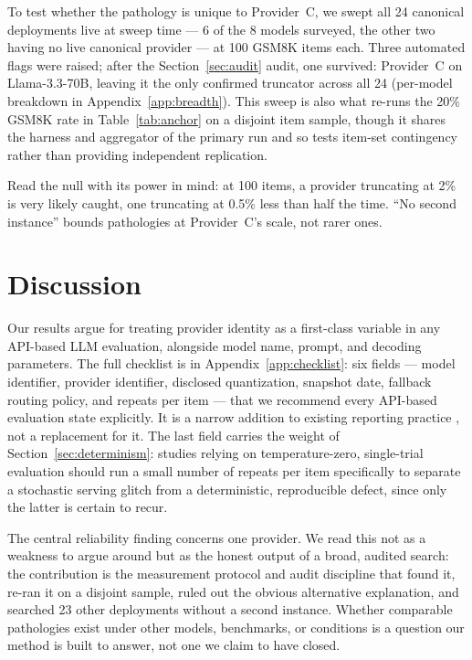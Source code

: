\documentclass[11pt]{article}
\begin{document}
To test whether the pathology is unique to Provider~C, we swept all 24
canonical deployments live at sweep time --- 6 of the 8 models
surveyed, the other two having no live canonical provider --- at 100
GSM8K items each. Three automated flags were raised; after the
Section~\ref{sec:audit} audit, one survived: Provider~C on
Llama-3.3-70B, leaving it the only confirmed truncator across all 24
(per-model breakdown in Appendix~\ref{app:breadth}). This sweep is
also what re-runs the 20\% GSM8K rate in Table~\ref{tab:anchor} on a
disjoint item sample, though it shares the harness and aggregator of
the primary run and so tests item-set contingency rather than
providing independent replication.

Read the null with its power in mind: at 100 items, a provider
truncating at 2\% is very likely caught, one truncating at 0.5\% less
than half the time. ``No second instance'' bounds pathologies at
Provider~C's scale, not rarer ones.
\section{Discussion}
\label{sec:checklist}

Our results argue for treating provider identity as a first-class
variable in any API-based LLM evaluation, alongside model name,
prompt, and decoding parameters. The full checklist is in Appendix~\ref{app:checklist}: six fields ---
model identifier, provider identifier, disclosed quantization,
snapshot date, fallback routing policy, and repeats per item --- that
we recommend every API-based evaluation state explicitly. It is a
narrow addition to existing reporting practice \citep{liang2023helm},
not a replacement for it. The last field carries the weight of
Section~\ref{sec:determinism}: studies relying on temperature-zero,
single-trial evaluation should run a small number of repeats per item
specifically to separate a stochastic serving glitch from a
deterministic, reproducible defect, since only the latter is certain
to recur.

The central reliability finding concerns one provider. We read this
not as a weakness to argue around but as the honest output of a broad,
audited search: the contribution is the measurement protocol and audit
discipline that found it, re-ran it on a disjoint sample, ruled out
the obvious alternative explanation, and searched 23 other deployments
without a second instance. Whether comparable pathologies exist under
other models, benchmarks, or conditions is a question our method is
built to answer, not one we claim to have closed.
\end{document}
